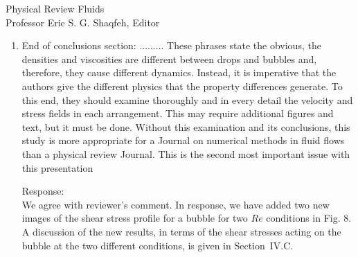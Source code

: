\documentclass{letter}
\begin{document}
\begin{letter}{
Physical Review Fluids\\
Professor Eric S. G. Shaqfeh, Editor\\}
\begin{enumerate}
Response: \\
We appreciate the reviewer's opinion, but it is important to keep in mind that
at the start of our study there were no guiding initial results that indicated
even potential values for critical Reynolds numbers for a bubble. The critical
Reynolds numbers found and presented were obtained after extensive and
expensive computations.  After lengthy computations, we were able to determine
the bubble $Re_{\rm c}$ number for 4 $Ca$ numbers.  We believe
that a bubble breakup critical curve drawn based on 4 points will be 
useful for low $Ca$ numbers.  Following the suggestion from the 
other reviewer (reviewer 1), 
we have added
a drop breakup critical curve ($\lambda$ = $\eta$ =1.0) 
to Fig. 12 (formerly Fig. 11).  
The difference in $Re_{\rm c}$ number between the bubble and 
the drop is clearer in
the new Fig. 12.  
In future work, we will determine the $Re_{\rm c}$ for a 
variety of high $Ca$ numbers 
in order to construct a detailed critical curve 
for a wider range of $Ca$ numbers.\\


\par\noindent
\item
\textsf
{\color{red}  End of conclusions section: .........
These phrases state the obvious, the densities and viscosities are different between drops and bubbles and, therefore, they cause different dynamics. 
Instead, it is imperative that the authors give the different physics that the property differences generate. 
To this end, they should examine thoroughly and in every detail the velocity and stress fields in each arrangement. 
This may require additional figures and text, but it must be done. Without this examination and its conclusions, this study is more appropriate for a 
Journal on numerical methods in fluid flows than a physical review Journal. This is the second most important issue with this presentation}
\vspace{3 mm}

Response: \\
{\color{red}
We agree with reviewer's comment. In response, we have added 
two new images of the
shear stress profile for a bubble for two $Re$ conditions in Fig. 8.
A discussion of the new results, in terms of the 
shear stresses acting on the
bubble at the two different conditions, 
is given in Section~I\hspace{-1.2pt}V.C. 
}
\\

\end{enumerate}


\end{letter}
\end{document}
